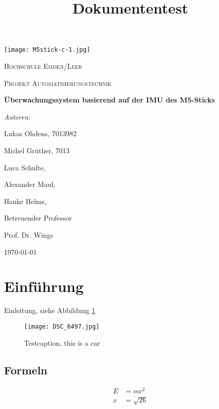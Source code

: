 \documentclass[a4paper,12pt]{article}
\title{Dokumententest}
\begin{document}
\begin{titlepage}
	\centering
	\texttt{[image: M5stick-c-1.jpg]}\par\vspace{1cm}
	{\scshape\LARGE Hochschule Emden/Leer \par}
	\vspace{1cm}
	{\scshape\Large Projekt Automatisierungstechnik\par}
	\vspace{1.5cm}
	{\huge\bfseries Überwachungssystem basierend
	auf der IMU des
	M5-Sticks\par}
	\vspace{2cm}
	{\Large\itshape Autoren:\par {Lukas Ohdens, 7013982\par
	Michel Grüther, 7013\par Luca Schulte, \par Alexander
	Maul, \par Hauke Helms, }\par}
	\vfill
	Betreuender Professor\par
	Prof. Dr. Wings

	\vfill

	{\large \today\par}
\end{titlepage}

\tableofcontents
\newpage


\section{Einführung}
Einleitung, siehe Abbildung \ref{Golf}\par

\begin{figure}[h]	%
\begin{center}
\texttt{[image: DSC\_6497.jpg]}
\caption{Testcaption, this is a car}
\label{Golf}
\end{center}
\end{figure}

\subsection{Formeln}

\begin{align}
E &= mc^2	\\
x &= \sqrt{26}
\end{align}
\end{document}
